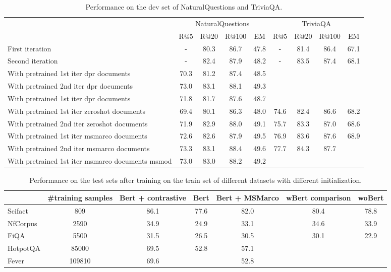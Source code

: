 \begin{table}[h!]
\centering
\begin{tabular}{l|cccc|cccc} 
 \toprule
  & \multicolumn{4}{c}{NaturalQuestions} & \multicolumn{4}{c}{TriviaQA} \\
  & R@5 & R@20 & R@100 & EM &  R@5 & R@20 & R@100 & EM \\ 
 \midrule
 First iteration \citep{izacard2021distilling} & - & 80.3 & 86.7 & 47.8 & - & 81.4 & 86.4 & 67.1 \\
 Second iteration \citep{izacard2021distilling} & - & 82.4 & 87.9 & 48.2 & - & 83.5 & 87.4 & 68.1 \\
 With pretrained 1st iter dpr documents & 70.3 & 81.2 & 87.4 & 48.5 \\
 With pretrained 2nd iter dpr documents & 73.0 & 83.1 & 88.1 & 49.3 \\
 With pretrained 1st iter dpr documents & 71.8 & 81.7 & 87.6 & 48.7 \\
 With pretrained 1st iter zeroshot documents & 69.4 & 80.1 & 86.3 & 48.0 & 74.6 & 82.4 & 86.6 & 68.2 \\
 With pretrained 2nd iter zeroshot documents & 71.9 & 82.9 & 88.0 & 49.1 & 75.7 & 83.3 & 87.0 & 68.6 \\
 With pretrained 1st iter msmarco documents & 72.6 & 82.6 & 87.9 & 49.5 & 76.9 & 83.6 & 87.6 & 68.9 \\ 
 With pretrained 2nd iter msmarco documents & 73.3 & 83.1 & 88.4 & 49.6 & 77.7 & 84.3 & 87.7 \\
 With pretrained 1st iter msmarco documents msmod & 73.0 & 83.0 & 88.2 & 49.2 \\ 
 \bottomrule
\end{tabular}
\caption{Performance on the dev set of NaturalQuestions and TriviaQA.}
\label{tab:qa_zs}
\end{table}

\begin{table}[h!]
\centering
\begin{tabular}{l|cccccc} 
 \toprule
  & \#training samples & Bert + contrastive & Bert & Bert + MSMarco &  wBert comparison & woBert \\
 \midrule
 Scifact & 809 & 86.1 & 77.6 & 82.0 & 80.4 & 78.8  \\
 NfCorpus & 2590 & 34.9 & 24.9 & 33.1 & 34.6 & 33.9 \\
 FiQA & 5500 & 31.5 & 26.5 & 30.5 & 30.1 & 22.9 \\
 HotpotQA & 85000 & 69.5 & 52.8 & 57.1 \\
 Fever & 109810 & 69.6 &  & 52.8 \\
 \bottomrule
\end{tabular}
\caption{Performance on the test sets after training on the train set of different datasets with different initialization.}
\label{tab:qa_zs}
\end{table}


